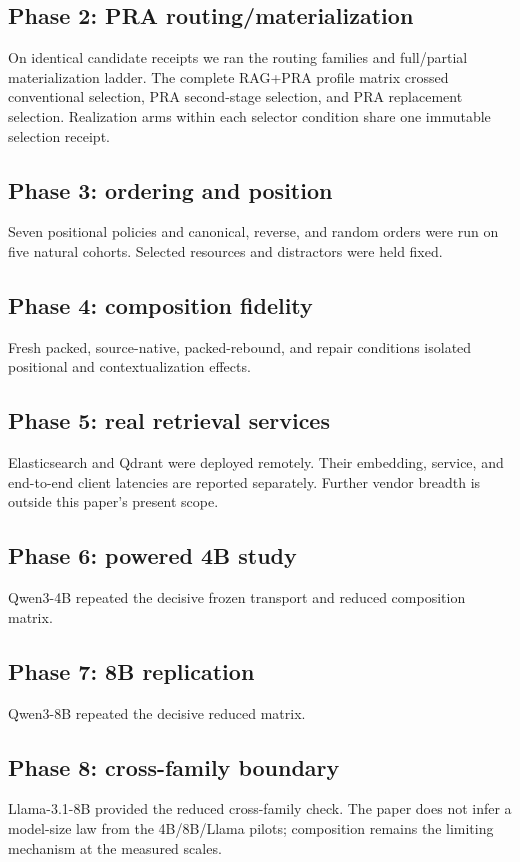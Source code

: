 \documentclass[11pt]{article}
\begin{document}
\subsection{Phase 2: PRA routing/materialization}
On identical candidate receipts we ran the routing families and full/partial
materialization ladder. The complete RAG+PRA profile matrix crossed conventional selection,
PRA second-stage selection, and PRA replacement selection. Realization arms
within each selector condition share one immutable selection receipt.

\subsection{Phase 3: ordering and position}
Seven positional policies and canonical, reverse, and random orders were run on
five natural cohorts. Selected resources and distractors were held fixed.

\subsection{Phase 4: composition fidelity}
Fresh packed, source-native, packed-rebound, and repair conditions isolated
positional and contextualization effects.

\subsection{Phase 5: real retrieval services}
Elasticsearch and Qdrant were deployed remotely. Their embedding, service, and
end-to-end client latencies are reported separately. Further vendor breadth is
outside this paper's present scope.

\subsection{Phase 6: powered 4B study}
Qwen3-4B repeated the decisive frozen transport and reduced composition matrix.

\subsection{Phase 7: 8B replication}
Qwen3-8B repeated the decisive reduced matrix.

\subsection{Phase 8: cross-family boundary}
Llama-3.1-8B provided the reduced cross-family check. The paper does not infer
a model-size law from the 4B/8B/Llama pilots; composition remains the limiting
mechanism at the measured scales.
\end{document}

